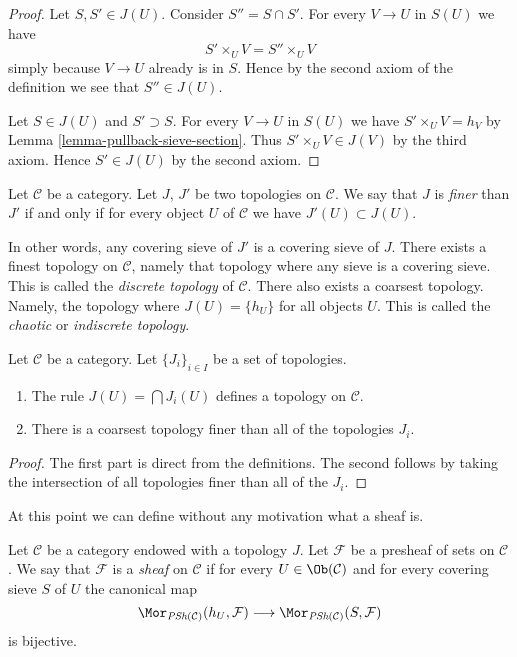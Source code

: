 \begin{proof}
Let $S, S' \in J(U)$. Consider $S'' = S \cap S'$. For every
$V \to U$ in $S(U)$ we have
$$
S' \times_U V = S'' \times_U V
$$
simply because $V \to U$ already is in $S$. Hence by the second
axiom of the definition we see that $S'' \in J(U)$.

\medskip\noindent
Let $S \in J(U)$ and $S' \supset S$. For every
$V \to U$ in $S(U)$ we have $S' \times_U V = h_V$ by
Lemma \ref{lemma-pullback-sieve-section}. Thus
$S' \times_U V \in J(V)$ by the third axiom. Hence
$S' \in J(U)$ by the second axiom.
\end{proof}

\begin{definition}
\label{definition-finer}
Let $\mathcal{C}$ be a category. Let $J$, $J'$ be
two topologies on $\mathcal{C}$. We say that $J$ is
{\it finer} than $J'$ if and only if for every object
$U$ of $\mathcal{C}$ we have $J'(U) \subset J(U)$.
\end{definition}

\noindent
In other words, any covering sieve of $J'$ is a
covering sieve of $J$. There exists a finest topology
on $\mathcal{C}$, namely that topology where any sieve
is a covering sieve. This is called the
{\it discrete topology} of $\mathcal{C}$.
There also exists a coarsest topology.
Namely, the topology where $J(U) = \{h_U\}$
for all objects $U$. This is called the
{\it chaotic} or {\it indiscrete topology}.

\begin{lemma}
\label{lemma-play-with-topologies}
Let $\mathcal{C}$ be a category.
Let $\{J_i\}_{i\in I}$ be a set of topologies.
\begin{enumerate}
\item The rule $J(U) = \bigcap J_i(U)$ defines
a topology on $\mathcal{C}$.
\item There is a coarsest topology finer than
all of the topologies $J_i$.
\end{enumerate}
\end{lemma}

\begin{proof}
The first part is direct from the definitions.
The second follows by taking the intersection
of all topologies finer than all of the $J_i$.
\end{proof}

\noindent
At this point we can define
without any motivation what a sheaf is.

\begin{definition}
\label{definition-sheaf-sets-topology}
Let $\mathcal{C}$ be a category endowed with a
topology $J$. Let $\mathcal{F}$ be a presheaf of sets
on $\mathcal{C}$.
We say that $\mathcal{F}$ is a
{\it sheaf} on $\mathcal{C}$
if for every $U \in \Ob(\mathcal{C})$ and for
every covering sieve $S$ of $U$ the canonical map
$$
\Mor_{\textit{PSh}(\mathcal{C})}(h_U, \mathcal{F})
\longrightarrow
\Mor_{\textit{PSh}(\mathcal{C})}(S, \mathcal{F})
$$
is bijective.
\end{definition}

